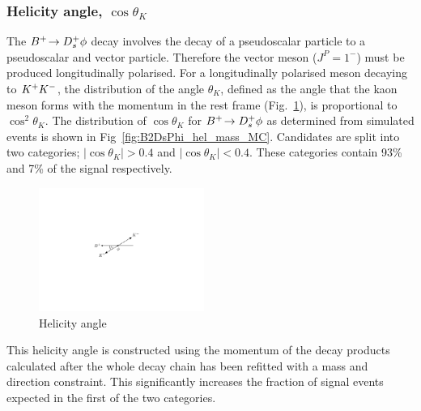 


\subsubsection{Helicity angle, $\cos\theta_{K}$} 

The ${{{B}^+}}\!\rightarrow {\ensuremath{{D}^+_{s}}}\phi$ decay involves the decay of a pseudoscalar particle to a pseudoscalar and vector particle. Therefore the \phiz vector meson ($J^{P} = 1^{-}$) must be produced longitudinally polarised. For a longitudinally polarised \phiz meson decaying to ${{K}^+}{{K}^-}$, the distribution of the angle $\theta_{K}$, defined as the angle that the kaon meson forms with the \Bp momentum in the \phiz rest frame (Fig.~\ref{fig:B2DsPhi_helicity_angle}), is proportional to $\cos^{2}{\theta_{K}}$. The distribution of $\cos{\theta_{K}}$ for ${{{B}^+}}\!\rightarrow {\ensuremath{{D}^+_{s}}}\phi$ as determined from simulated events is shown in Fig~\ref{fig:B2DsPhi_hel_mass_MC}. Candidates are split into two categories; $|\cos{\theta_{K}} |> 0.4$ and $|\cos{\theta_{K}} |< 0.4$. These categories contain 93\% and 7\% of the signal respectively.
\begin{figure}[!h]
    \centering
    \includegraphics[width=0.48\textwidth]{figs/B2DsPhi/helicityangle.pdf}
    \caption{Helicity angle}
    \label{fig:B2DsPhi_helicity_angle}   
\end{figure}

This helicity angle is constructed using the momentum of the decay products calculated after the whole decay chain has been refitted with a \Dsp mass and \Bp direction constraint. This significantly increases the fraction of signal events expected in the first of the two categories.


